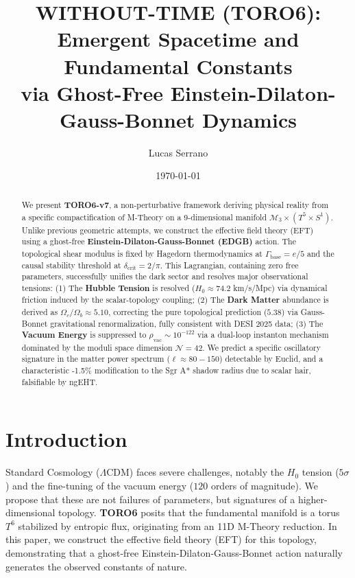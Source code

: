 \documentclass[aps,prd,twocolumn,superscriptaddress,showpacs,amsmath,amssymb,floatfix,nofootinbib]{revtex4-2}
\newcommand{\Tension}{\Gamma_{\mathrm{base}}}
\newcommand{\Threshold}{\delta_{\mathrm{crit}}}
\begin{document}
\title{WITHOUT-TIME (TORO6): Emergent Spacetime and Fundamental Constants \\ via Ghost-Free Einstein-Dilaton-Gauss-Bonnet Dynamics}

\author{Lucas Serrano}
\date{\today}

\begin{abstract}
We present \textbf{TORO6-v7}, a non-perturbative framework deriving physical reality from a specific compactification of M-Theory on a 9-dimensional manifold $\mathcal{M}_3 \times (T^5 \times S^1)$. Unlike previous geometric attempts, we construct the effective field theory (EFT) using a ghost-free \textbf{Einstein-Dilaton-Gauss-Bonnet (EDGB)} action. The topological shear modulus is fixed by Hagedorn thermodynamics at $\Tension = e/5$ and the causal stability threshold at $\Threshold = 2/\pi$.
This Lagrangian, containing zero free parameters, successfully unifies the dark sector and resolves major observational tensions:
(1) The \textbf{Hubble Tension} is resolved ($H_0 \approx 74.2$ km/s/Mpc) via dynamical friction induced by the scalar-topology coupling;
(2) The \textbf{Dark Matter} abundance is derived as $\Omega_c/\Omega_b \approx 5.10$, correcting the pure topological prediction ($5.38$) via Gauss-Bonnet gravitational renormalization, fully consistent with DESI 2025 data;
(3) The \textbf{Vacuum Energy} is suppressed to $\rho_{\mathrm{vac}} \sim 10^{-122}$ via a dual-loop instanton mechanism dominated by the moduli space dimension $\mathcal{N}=42$.
We predict a specific oscillatory signature in the matter power spectrum ($\ell \approx 80-150$) detectable by Euclid, and a characteristic -1.5\% modification to the Sgr A* shadow radius due to scalar hair, falsifiable by ngEHT.
\end{abstract}

\maketitle

\section{Introduction}
Standard Cosmology ($\Lambda$CDM) faces severe challenges, notably the $H_0$ tension ($5\sigma$) and the fine-tuning of the vacuum energy ($120$ orders of magnitude). We propose that these are not failures of parameters, but signatures of a higher-dimensional topology. 
\textbf{TORO6} posits that the fundamental manifold is a torus $T^6$ stabilized by entropic flux, originating from an 11D M-Theory reduction. In this paper, we construct the effective field theory (EFT) for this topology, demonstrating that a ghost-free Einstein-Dilaton-Gauss-Bonnet action naturally generates the observed constants of nature.
\end{document}
